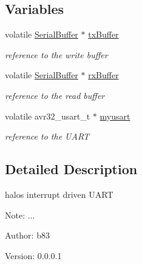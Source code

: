 \subsection*{Variables}
\begin{CompactItemize}
\item 
\hypertarget{group___u_a_r_t_gd7f6a2a3df8e38e27346cdce67a384e5}{
volatile \hyperlink{struct_serial_buffer_tag}{SerialBuffer} $\ast$ \hyperlink{group___u_a_r_t_gd7f6a2a3df8e38e27346cdce67a384e5}{txBuffer}}
\label{group___u_a_r_t_gd7f6a2a3df8e38e27346cdce67a384e5}

\begin{CompactList}\small\item\em reference to the write buffer \item\end{CompactList}\item 
\hypertarget{group___u_a_r_t_ga9654342dbd9496b7f76a6453a7f0dff}{
volatile \hyperlink{struct_serial_buffer_tag}{SerialBuffer} $\ast$ \hyperlink{group___u_a_r_t_ga9654342dbd9496b7f76a6453a7f0dff}{rxBuffer}}
\label{group___u_a_r_t_ga9654342dbd9496b7f76a6453a7f0dff}

\begin{CompactList}\small\item\em reference to the read buffer \item\end{CompactList}\item 
\hypertarget{group___u_a_r_t_g6dd5e0e639beaa7c61014c923478b465}{
volatile avr32\_\-usart\_\-t $\ast$ \hyperlink{group___u_a_r_t_g6dd5e0e639beaa7c61014c923478b465}{myusart}}
\label{group___u_a_r_t_g6dd5e0e639beaa7c61014c923478b465}

\begin{CompactList}\small\item\em reference to the UART \item\end{CompactList}\end{CompactItemize}


\subsection{Detailed Description}
halos interrupt driven UART 

\begin{Desc}
\item[Note:]... \end{Desc}
\begin{Desc}
\item[Author:]b83 \end{Desc}
\begin{Desc}
\item[Version:]0.0.0.1 \end{Desc}


